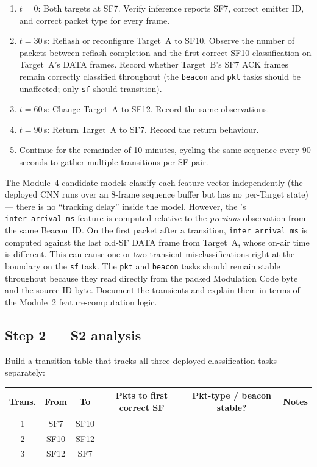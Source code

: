 \documentclass[11pt,letterpaper]{article}
\begin{document}
\begin{enumerate}[leftmargin=2em]
	\item $t = 0$: Both targets at SF7. Verify inference reports SF7, correct emitter ID, and correct packet type for every frame.
	\item $t = 30$\,s: Reflash or reconfigure Target~A to SF10. Observe the number of packets between reflash completion and the first correct SF10 classification on Target~A's DATA frames. Record whether Target~B's SF7 ACK frames remain correctly classified throughout (the \texttt{beacon} and \texttt{pkt} tasks should be unaffected; only \texttt{sf} should transition).
	\item $t = 60$\,s: Change Target~A to SF12. Record the same observations.
	\item $t = 90$\,s: Return Target~A to SF7. Record the return behaviour.
	\item Continue for the remainder of 10 minutes, cycling the same sequence every 90 seconds to gather multiple transitions per SF pair.
\end{enumerate}

\begin{tcolorbox}[warning={Transient Misclassification at SF Boundaries}]
	The Module~4 candidate models classify each feature vector independently (the deployed CNN runs over an 8-frame sequence buffer but has no per-Target state) --- there is no ``tracking delay'' inside the model. However, the \FPGA{}'s \texttt{inter\_arrival\_ms} feature is computed relative to the \emph{previous} observation from the same Beacon~ID. On the first packet after a transition, \texttt{inter\_arrival\_ms} is computed against the last old-SF DATA frame from Target~A, whose on-air time is different. This can cause one or two transient misclassifications right at the boundary on the \texttt{sf} task. The \texttt{pkt} and \texttt{beacon} tasks should remain stable throughout because they read directly from the packed Modulation Code byte and the source-ID byte. Document the transients and explain them in terms of the Module~2 feature-computation logic.
\end{tcolorbox}

\subsection{Step 2 --- S2 analysis}
Build a transition table that tracks all three deployed classification tasks separately:

\begin{table}[h!]
	\centering
	\renewcommand{\arraystretch}{1.3}
	\begin{tabularx}{\textwidth}{c c c c c X}
		\toprule
		\textbf{Trans.} & \textbf{From} & \textbf{To} & \textbf{Pkts to first correct SF} & \textbf{Pkt-type / beacon stable?} & \textbf{Notes} \\
		\midrule
		1 & SF7  & SF10 & & & \\
		2 & SF10 & SF12 & & & \\
		3 & SF12 & SF7  & & & \\
		\bottomrule
	\end{tabularx}
\end{table}
\end{document}
